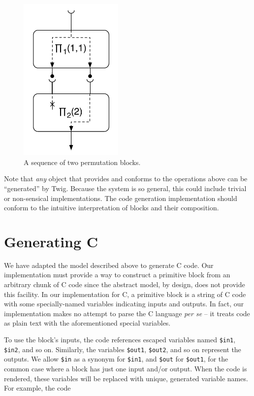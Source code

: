 \begin{figure}[ht]
\centering
\includegraphics[width=2in]{images/code-gen-perm}
\caption{A sequence of two permutation blocks.}
\label{fig:codegen-perm}
\end{figure}

Note that \emph{any} object that provides and conforms to the
operations above can be ``generated'' by Twig. Because the system
is so general, this could include trivial or non-sensical
implementations. The code generation implementation should conform
to the intuitive interpretation of blocks and their composition.


\section{Generating C}
\label{sec:code-gen:c}

We have adapted the model described above to generate C code. Our
implementation must provide a way to construct a primitive block
from an arbitrary chunk of C code since the abstract model, by
design, does not provide this facility. In our implementation for
C, a primitive block is a string of C code with some
specially-named variables indicating inputs and outputs. In fact,
our implementation makes no attempt to parse the C language
\emph{per se} -- it treats code as plain text with the
aforementioned special variables.

To use the block's inputs, the code references escaped variables
named \texttt{\$in1}, \texttt{\$in2}, and so on. Similarly, the
variables \texttt{\$out1}, \texttt{\$out2}, and so on represent
the outputs. We allow \texttt{\$in} as a synonym for
\texttt{\$in1}, and \texttt{\$out} for \texttt{\$out1}, for the
common case where a block has just one input and/or output. When
the code is rendered, these variables will be replaced with
unique, generated variable names. For example, the code

